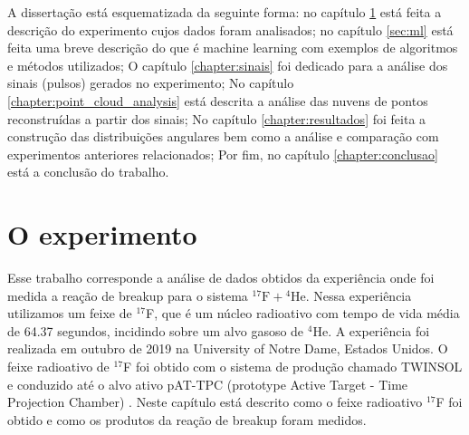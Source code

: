 \documentclass[a4paper,12pt,oneside]{book}
\begin{document}
\par A dissertação está esquematizada da seguinte forma: no capítulo \ref{PATTPC} está feita a descrição do experimento cujos dados foram analisados; no capítulo \ref{sec:ml} está feita uma breve descrição do que é machine learning com exemplos de algoritmos e métodos utilizados; O capítulo \ref{chapter:sinais} foi dedicado para a análise dos sinais (pulsos) gerados no experimento; No capítulo \ref{chapter:point_cloud_analysis} está descrita a análise das nuvens de pontos reconstruídas a partir dos sinais; No capítulo \ref{chapter:resultados} foi feita a construção das distribuições angulares bem como a análise e comparação com experimentos anteriores relacionados; Por fim, no capítulo \ref{chapter:conclusao} está a conclusão do trabalho.

\chapter{O experimento}\label{PATTPC}


\par Esse trabalho corresponde a análise de dados obtidos da experiência onde foi medida a reação de breakup para o sistema ${}^{17}\mathrm{F}+{}^{4}\mathrm{He}$. Nessa experiência utilizamos um feixe de $^{17}$F, que é um núcleo radioativo com tempo de vida média de 64.37 segundos, incidindo sobre um alvo gasoso de $^{4}$He. A experiência foi realizada em outubro de 2019 na University of Notre Dame, Estados Unidos. O feixe radioativo de $^{17}$F foi obtido com o sistema de produção chamado TWINSOL \cite{twinsol} e conduzido até o alvo ativo pAT-TPC (prototype Active Target - Time Projection Chamber) \cite{pattpc}. Neste capítulo está descrito como o feixe radioativo ${}^{17}$F foi obtido e como os produtos da reação de breakup foram medidos.

\end{document}
